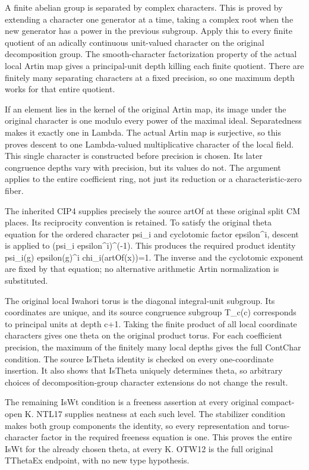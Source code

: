 A finite abelian group is separated by complex characters. This is proved by extending a character one generator at a time, taking a complex root when the new generator has a power in the previous subgroup. Apply this to every finite quotient of an adically continuous unit-valued character on the original decomposition group. The smooth-character factorization property of the actual local Artin map gives a principal-unit depth killing each finite quotient. There are finitely many separating characters at a fixed precision, so one maximum depth works for that entire quotient.

If an element lies in the kernel of the original Artin map, its image under the original character is one modulo every power of the maximal ideal. Separatedness makes it exactly one in Lambda. The actual Artin map is surjective, so this proves descent to one Lambda-valued multiplicative character of the local field. This single character is constructed before precision is chosen. Its later congruence depths vary with precision, but its values do not. The argument applies to the entire coefficient ring, not just its reduction or a characteristic-zero fiber.

The inherited CIP4 supplies precisely the source artOf at these original split CM places. Its reciprocity convention is retained. To satisfy the original theta equation for the ordered character psi\_\allowbreak{}i and cyclotomic factor epsilon\textasciicircum{}i, descent is applied to (psi\_\allowbreak{}i epsilon\textasciicircum{}i)\textasciicircum{}(-1). This produces the required product identity psi\_\allowbreak{}i(g) epsilon(g)\textasciicircum{}i chi\_\allowbreak{}i(artOf(x))=1. The inverse and the cyclotomic exponent are fixed by that equation; no alternative arithmetic Artin normalization is substituted.

The original local Iwahori torus is the diagonal integral-unit subgroup. Its coordinates are unique, and its source congruence subgroup T\_\allowbreak{}c(c) corresponds to principal units at depth c+1. Taking the finite product of all local coordinate characters gives one theta on the original product torus. For each coefficient precision, the maximum of the finitely many local depths gives the full ContChar condition. The source IsTheta identity is checked on every one-coordinate insertion. It also shows that IsTheta uniquely determines theta, so arbitrary choices of decomposition-group character extensions do not change the result.

The remaining IsWt condition is a freeness assertion at every original compact-open K. NTL17 supplies neatness at each such level. The stabilizer condition makes both group components the identity, so every representation and torus-character factor in the required freeness equation is one. This proves the entire IsWt for the already chosen theta, at every K. OTW12 is the full original TThetaEx endpoint, with no new type hypothesis.

